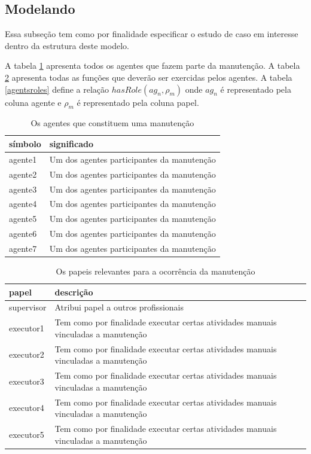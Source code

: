 \documentclass[12pt]{article}
\begin{document}
\subsection{Modelando}

Essa subseção tem como por finalidade especificar o estudo de caso em interesse dentro da estrutura deste modelo. 



A tabela \ref{agents} apresenta todos os agentes que fazem parte da manutenção. A tabela \ref{roles} apresenta todas as funções que deverão ser exercidas pelos agentes. A tabela \ref{agentsroles} define a relação $hasRole(ag_n,\rho_m)$ onde $ag_n$ é representado pela coluna agente e $\rho_m$ é representado pela coluna papel.

\begin{table}[H]
\centering
\begin{tabular}{|l|l|}
\hline
\textbf{símbolo} & \textbf{significado} \\ \hline
agente1 & Um dos agentes participantes da manutenção \\ \hline
agente2 & Um dos agentes participantes da manutenção \\ \hline
agente3 & Um dos agentes participantes da manutenção \\ \hline
agente4 & Um dos agentes participantes da manutenção \\ \hline
agente5 & Um dos agentes participantes da manutenção \\ \hline
agente6 & Um dos agentes participantes da manutenção \\ \hline
agente7 & Um dos agentes participantes da manutenção \\ \hline
\end{tabular}
\caption{Os agentes que constituem uma manutenção}
\label{agents}
\end{table}


\begin{table}[H]
\centering
\begin{tabular}{|l|l|}
\hline
\textbf{papel} & \textbf{descrição} \\ \hline
supervisor & Atribui papel a outros profissionais \\ \hline
executor1 & Tem como por finalidade executar certas atividades manuais vinculadas a manutenção \\ \hline
executor2 & Tem como por finalidade executar certas atividades manuais vinculadas a manutenção \\ \hline
executor3 & Tem como por finalidade executar certas atividades manuais vinculadas a manutenção \\ \hline
executor4 & Tem como por finalidade executar certas atividades manuais vinculadas a manutenção \\ \hline
executor5 & Tem como por finalidade executar certas atividades manuais vinculadas a manutenção \\ \hline
\end{tabular}
\caption{Os papeis relevantes para a ocorrência da manutenção}
\label{roles}
\end{table}
\end{document}
